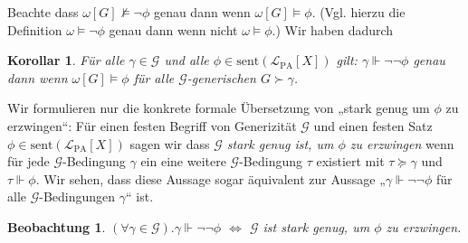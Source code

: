 \documentclass[nofonts]{uebung}
\newtheorem{corollary}[theorem]{Korollar}
\newtheorem{observation}[theorem]{Beobachtung}
\theoremstyle{definition}
\begin{document}
Beachte dass $\omega[G]\not\vDash\neg\phi$ genau dann wenn $\omega[G]\vDash\phi$. (Vgl. hierzu die Definition $\omega\vDash\neg\phi$ genau dann wenn nicht $\omega\vDash\phi$.) Wir haben dadurch
\begin{corollary}\label{cor:double-negation-truth}
    Für alle $\gamma\in\mathcal G$ und alle $\phi\in \mathrm{sent}(\mathcal L_{\mathrm{PA}}[X])$ gilt:
    $\gamma\Vdash\neg\neg\phi$ genau dann wenn $\omega[G]\vDash\phi$ für alle $\mathcal G$-generischen $G\succ\gamma$.
\end{corollary}

Wir formulieren nur die konkrete formale Übersetzung von „stark genug um $\phi$ zu erzwingen“:
Für einen festen Begriff von Generizität $\mathcal G$ und einen festen Satz $\phi\in \mathrm{sent}(\mathcal L_{\mathrm{PA}}[X])$ sagen wir dass \emph{$\mathcal G$ stark genug ist, um $\phi$ zu erzwingen} wenn für jede $\mathcal G$-Bedingung $\gamma$ ein eine weitere $\mathcal G$-Bedingung $\tau$ existiert mit $\tau\succeq \gamma$ und $\tau\Vdash\phi$.
Wir sehen, dass diese Aussage sogar äquivalent zur Aussage „$\gamma\Vdash\neg\neg\phi$ für alle $\mathcal G$-Bedingungen $\gamma$“ ist.

\begin{observation}
$(\forall \gamma\in\mathcal G).\gamma\Vdash\neg\neg\phi$ $\iff$ $\mathcal G$ ist stark genug, um $\phi$ zu erzwingen.
\end{observation}

\end{document}
